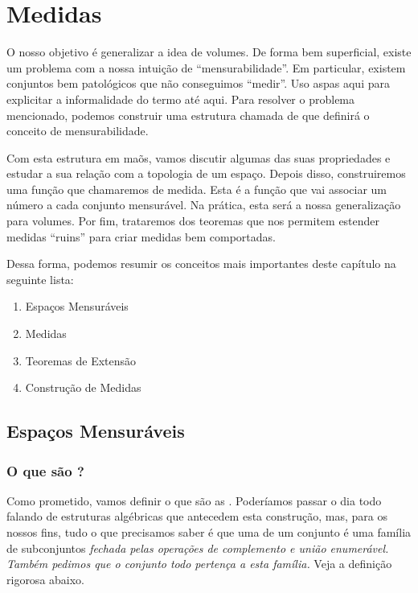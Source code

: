 \chapter{Medidas}

O nosso objetivo é generalizar a idea de volumes. De forma bem superficial, existe um problema com a nossa intuição de ``mensurabilidade''. Em particular, existem conjuntos bem patológicos que não conseguimos ``medir''. Uso aspas aqui para explicitar a informalidade do termo até aqui. Para resolver o problema mencionado, podemos construir uma estrutura chamada de \sigmaAlg que definirá o conceito de mensurabilidade.

Com esta estrutura em maõs, vamos discutir algumas das suas propriedades e estudar a sua relação com a topologia de um espaço. Depois disso, construiremos uma função que chamaremos de medida. Esta é a função que vai associar um número a cada conjunto mensurável. Na prática, esta será a nossa generalização para volumes. Por fim, trataremos dos teoremas que nos permitem estender medidas ``ruins'' para criar medidas bem comportadas.

Dessa forma, podemos resumir os conceitos mais importantes deste capítulo na seguinte lista:

\begin{enumerate}
    \item Espaços Mensuráveis
    \item Medidas
    \item Teoremas de Extensão
    \item Construção de Medidas
\end{enumerate}




\section{Espaços Mensuráveis}
\subsection*{O que são \sigmaAlgs?}
Como prometido, vamos definir o que são as \textbf{\sigmaAlgs}. Poderíamos passar o dia todo falando de estruturas algébricas que antecedem esta construção, mas, para os nossos fins, tudo o que precisamos saber é que uma \sigmaAlg de um conjunto é uma família de subconjuntos \textit{fechada pelas operações de complemento e união enumerável. Também pedimos que o conjunto todo pertença a esta família.} Veja a definição rigorosa abaixo.

